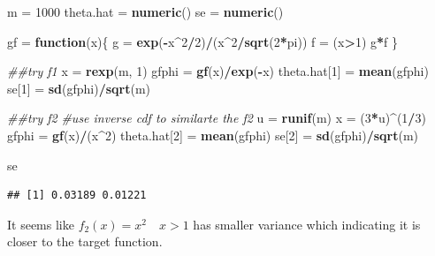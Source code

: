 \documentclass[
]{article}
\newenvironment{Shaded}{\begin{snugshade}}{\end{snugshade}}
\newcommand{\CommentTok}[1]{\textcolor[rgb]{0.56,0.35,0.01}{\textit{#1}}}
\newcommand{\ControlFlowTok}[1]{\textcolor[rgb]{0.13,0.29,0.53}{\textbf{#1}}}
\newcommand{\DecValTok}[1]{\textcolor[rgb]{0.00,0.00,0.81}{#1}}
\newcommand{\KeywordTok}[1]{\textcolor[rgb]{0.13,0.29,0.53}{\textbf{#1}}}
\newcommand{\NormalTok}[1]{#1}
\newcommand{\OperatorTok}[1]{\textcolor[rgb]{0.81,0.36,0.00}{\textbf{#1}}}
\newcommand{\StringTok}[1]{\textcolor[rgb]{0.31,0.60,0.02}{#1}}
\begin{document}
\begin{Shaded}
\begin{Highlighting}[]
\NormalTok{m =}\StringTok{ }\DecValTok{1000}
\NormalTok{theta.hat =}\StringTok{ }\KeywordTok{numeric}\NormalTok{()}
\NormalTok{se =}\StringTok{ }\KeywordTok{numeric}\NormalTok{()}

\NormalTok{gf =}\StringTok{ }\ControlFlowTok{function}\NormalTok{(x)\{}
\NormalTok{  g =}\StringTok{ }\KeywordTok{exp}\NormalTok{(}\OperatorTok{-}\NormalTok{x}\OperatorTok{^}\DecValTok{2}\OperatorTok{/}\DecValTok{2}\NormalTok{)}\OperatorTok{/}\NormalTok{(x}\OperatorTok{^}\DecValTok{2}\OperatorTok{/}\KeywordTok{sqrt}\NormalTok{(}\DecValTok{2}\OperatorTok{*}\NormalTok{pi))}
\NormalTok{  f =}\StringTok{ }\NormalTok{(x}\OperatorTok{>}\DecValTok{1}\NormalTok{)}
\NormalTok{  g}\OperatorTok{*}\NormalTok{f}
\NormalTok{\}}

\CommentTok{##try f1}
\NormalTok{x =}\StringTok{ }\KeywordTok{rexp}\NormalTok{(m, }\DecValTok{1}\NormalTok{)}
\NormalTok{gfphi =}\StringTok{ }\KeywordTok{gf}\NormalTok{(x)}\OperatorTok{/}\KeywordTok{exp}\NormalTok{(}\OperatorTok{-}\NormalTok{x)}
\NormalTok{theta.hat[}\DecValTok{1}\NormalTok{] =}\StringTok{ }\KeywordTok{mean}\NormalTok{(gfphi)}
\NormalTok{se[}\DecValTok{1}\NormalTok{] =}\StringTok{ }\KeywordTok{sd}\NormalTok{(gfphi)}\OperatorTok{/}\KeywordTok{sqrt}\NormalTok{(m)}

\CommentTok{##try f2}
\CommentTok{#use inverse cdf to similarte the f2}
\NormalTok{u =}\StringTok{ }\KeywordTok{runif}\NormalTok{(m)}
\NormalTok{x =}\StringTok{ }\NormalTok{(}\DecValTok{3}\OperatorTok{*}\NormalTok{u)}\OperatorTok{^}\NormalTok{(}\DecValTok{1}\OperatorTok{/}\DecValTok{3}\NormalTok{)}
\NormalTok{gfphi =}\StringTok{ }\KeywordTok{gf}\NormalTok{(x)}\OperatorTok{/}\NormalTok{(x}\OperatorTok{^}\DecValTok{2}\NormalTok{)}
\NormalTok{theta.hat[}\DecValTok{2}\NormalTok{] =}\StringTok{ }\KeywordTok{mean}\NormalTok{(gfphi)}
\NormalTok{se[}\DecValTok{2}\NormalTok{] =}\StringTok{ }\KeywordTok{sd}\NormalTok{(gfphi)}\OperatorTok{/}\KeywordTok{sqrt}\NormalTok{(m)}


\NormalTok{se}
\end{Highlighting}
\end{Shaded}

\begin{verbatim}
## [1] 0.03189 0.01221
\end{verbatim}

It seems like \(f_2(x) = {x^2}\quad x>1\) has smaller variance which
indicating it is closer to the target function.
\end{document}
